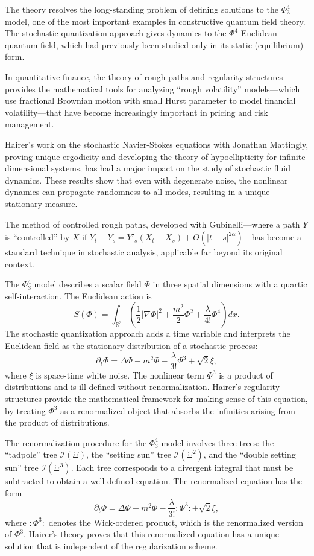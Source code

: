 The theory resolves the long-standing problem of defining solutions to the $\Phi^4_3$ model, one of the most important examples in constructive quantum field theory. The stochastic quantization approach gives dynamics to the $\Phi^4$ Euclidean quantum field, which had previously been studied only in its static (equilibrium) form.

In quantitative finance, the theory of rough paths and regularity structures provides the mathematical tools for analyzing ``rough volatility'' models---which use fractional Brownian motion with small Hurst parameter to model financial volatility---that have become increasingly important in pricing and risk management.

Hairer's work on the stochastic Navier-Stokes equations with Jonathan Mattingly, proving unique ergodicity and developing the theory of hypoellipticity for infinite-dimensional systems, has had a major impact on the study of stochastic fluid dynamics. These results show that even with degenerate noise, the nonlinear dynamics can propagate randomness to all modes, resulting in a unique stationary measure.

The method of controlled rough paths, developed with Gubinelli---where a path $Y$ is ``controlled'' by $X$ if $Y_t - Y_s = Y'_s(X_t - X_s) + O(|t-s|^{2\alpha})$---has become a standard technique in stochastic analysis, applicable far beyond its original context.

The $\Phi^4_3$ model describes a scalar field $\Phi$ in three spatial dimensions with a quartic self-interaction. The Euclidean action is
\[
S(\Phi) = \int_{\mathbb{R}^3} \left(\frac{1}{2}|\nabla\Phi|^2 + \frac{m^2}{2}\Phi^2 + \frac{\lambda}{4!}\Phi^4\right) dx.
\]
The stochastic quantization approach adds a time variable and interprets the Euclidean field as the stationary distribution of a stochastic process:
\[
\partial_t \Phi = \Delta\Phi - m^2\Phi - \frac{\lambda}{3!}\Phi^3 + \sqrt{2}\xi,
\]
where $\xi$ is space-time white noise. The nonlinear term $\Phi^3$ is a product of distributions and is ill-defined without renormalization. Hairer's regularity structures provide the mathematical framework for making sense of this equation, by treating $\Phi^3$ as a renormalized object that absorbs the infinities arising from the product of distributions.

The renormalization procedure for the $\Phi^4_3$ model involves three trees: the ``tadpole'' tree $\mathcal{I}(\Xi)$, the ``setting sun'' tree $\mathcal{I}(\Xi^2)$, and the ``double setting sun'' tree $\mathcal{I}(\Xi^3)$. Each tree corresponds to a divergent integral that must be subtracted to obtain a well-defined equation. The renormalized equation has the form
\[
\partial_t \Phi = \Delta\Phi - m^2\Phi - \frac{\lambda}{3!}:\!\Phi^3\!: + \sqrt{2}\xi,
\]
where $:\!\Phi^3\!:$ denotes the Wick-ordered product, which is the renormalized version of $\Phi^3$. Hairer's theory proves that this renormalized equation has a unique solution that is independent of the regularization scheme.


